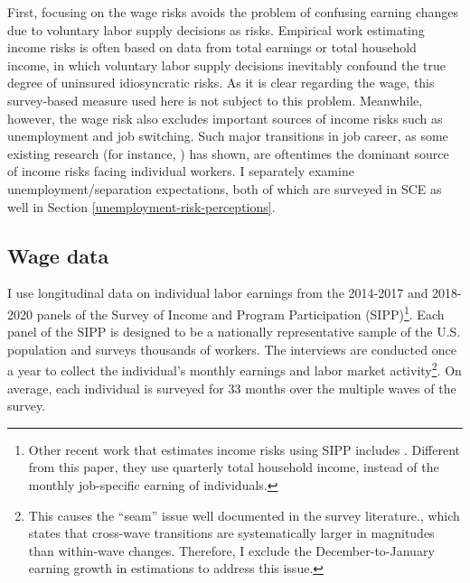 First, focusing on the wage risks avoids the problem of confusing earning changes due to voluntary labor supply decisions as risks. Empirical work estimating income risks is often based on data from total earnings or total household income, in which voluntary labor supply decisions inevitably confound the true degree of uninsured idiosyncratic risks. As it is clear regarding the wage, this survey-based measure used here is not subject to this problem. Meanwhile, however, the wage risk also excludes important sources of income risks such as unemployment and job switching. Such major transitions in job career, as some existing research (for instance, \cite{low2010wage}) has shown, are oftentimes the dominant source of income risks facing individual workers. I separately examine unemployment/separation expectations, both of which are surveyed in SCE as well in Section \ref{unemployment-risk-perceptions}. 



\subsection{Wage data}

I use longitudinal data on individual labor earnings from the 2014-2017 and 2018-2020 panels of the Survey of Income and Program Participation (SIPP)\footnote{Other recent work that estimates income risks using SIPP includes \cite{bayer2019precautionary}. Different from this paper, they use quarterly total household income, instead of the monthly job-specific earning of individuals.}. Each panel of the SIPP is designed to be a nationally representative sample of the U.S. population and surveys thousands of workers. The interviews are conducted once a year to collect the individual's monthly earnings and labor market activity\footnote{This causes the ``seam'' issue well documented in the survey literature\citep{moore2008seam}., which states that cross-wave transitions are systematically larger in magnitudes than within-wave changes. Therefore, I exclude the December-to-January earning growth in estimations to address this issue.}. On average, each individual is surveyed for 33 months over the multiple waves of the survey.

